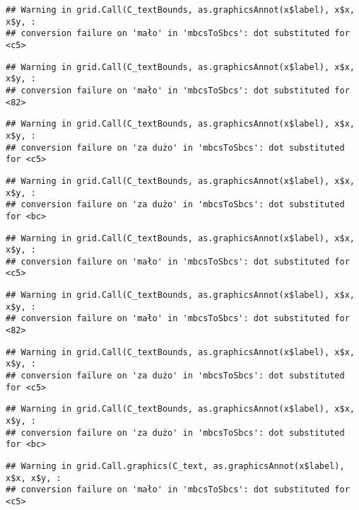 \documentclass[
]{book}
\begin{document}
\begin{verbatim}
## Warning in grid.Call(C_textBounds, as.graphicsAnnot(x$label), x$x, x$y, :
## conversion failure on 'mało' in 'mbcsToSbcs': dot substituted for <c5>
\end{verbatim}

\begin{verbatim}
## Warning in grid.Call(C_textBounds, as.graphicsAnnot(x$label), x$x, x$y, :
## conversion failure on 'mało' in 'mbcsToSbcs': dot substituted for <82>
\end{verbatim}

\begin{verbatim}
## Warning in grid.Call(C_textBounds, as.graphicsAnnot(x$label), x$x, x$y, :
## conversion failure on 'za dużo' in 'mbcsToSbcs': dot substituted for <c5>
\end{verbatim}

\begin{verbatim}
## Warning in grid.Call(C_textBounds, as.graphicsAnnot(x$label), x$x, x$y, :
## conversion failure on 'za dużo' in 'mbcsToSbcs': dot substituted for <bc>
\end{verbatim}

\begin{verbatim}
## Warning in grid.Call(C_textBounds, as.graphicsAnnot(x$label), x$x, x$y, :
## conversion failure on 'mało' in 'mbcsToSbcs': dot substituted for <c5>
\end{verbatim}

\begin{verbatim}
## Warning in grid.Call(C_textBounds, as.graphicsAnnot(x$label), x$x, x$y, :
## conversion failure on 'mało' in 'mbcsToSbcs': dot substituted for <82>
\end{verbatim}

\begin{verbatim}
## Warning in grid.Call(C_textBounds, as.graphicsAnnot(x$label), x$x, x$y, :
## conversion failure on 'za dużo' in 'mbcsToSbcs': dot substituted for <c5>
\end{verbatim}

\begin{verbatim}
## Warning in grid.Call(C_textBounds, as.graphicsAnnot(x$label), x$x, x$y, :
## conversion failure on 'za dużo' in 'mbcsToSbcs': dot substituted for <bc>
\end{verbatim}

\begin{verbatim}
## Warning in grid.Call.graphics(C_text, as.graphicsAnnot(x$label), x$x, x$y, :
## conversion failure on 'mało' in 'mbcsToSbcs': dot substituted for <c5>
\end{verbatim}
\end{document}
